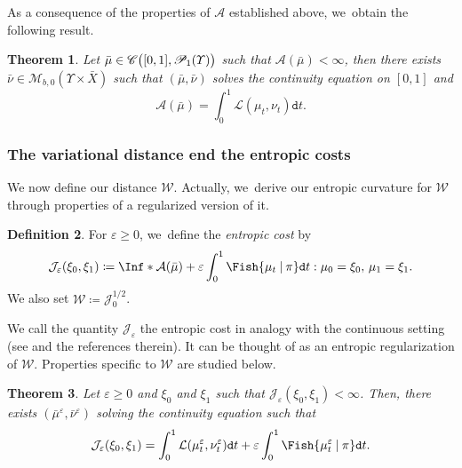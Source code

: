 \documentclass[JEP,XML,SOM,Unicode,published]{cedram}
\newtheorem{theorem}{Theorem}[section]
\theoremstyle{definition}
\newtheorem{definition}[theorem]{Definition}
\theoremstyle{remark}
\DeclarePairedDelimiter{\paren}{\lparen}{\rparen}
\newcommand{\given}[1][]{%
\nonscript\:#1\vert
\allowbreak
\nonscript\:
\mathopen{}}
\begin{document}
As a consequence of the properties of $\mathcal{A}$ established above, we~obtain the following result.

\begin{theorem}\label{t:action-minizers}
Let $\bar{\mu} \in \mathscr{C}\paren[\big]{[0,1], \mathscr{P}_{1}(\varUpsilon)}$ such that $\mathcal{A}(\bar{\mu}) < \infty$, then there exists $\bar{\nu} \in \mathscr{M}_{b,0}(\varUpsilon \times \bar{X})$ such that $(\bar{\mu}, \bar{\nu})$ solves the continuity equation on $[0,1]$ and
\begin{equation*}
\mathcal{A}(\bar{\mu}) = \int_{0}^{1} \mathcal{L}(\mu_{t}, \nu_{t}) \mathtt{d} t.
\end{equation*}
\end{theorem}

\subsubsection{The variational distance end the entropic costs}

We now define our distance $\mathcal{W}$.
Actually, we~derive our entropic curvature for $\mathcal{W}$ through properties of a regularized version of it.
\begin{definition}
For $\varepsilon \geq 0$, we~define the \emph{entropic cost} by
\begin{equation*}
\mathcal{J}_{\varepsilon}(\xi_{0}, \xi_{1}) \coloneq \Inf*{ \mathcal{A}(\bar{\mu}) + \varepsilon \int_{0}^{1} \Fish{ \mu_{t} \given \pi } \mathtt{d} t : \mu_{0} = \xi_{0},\, \mu_{1} = \xi_{1} }.
\end{equation*}
We also set $\mathcal{W} \coloneq \mathcal{J}_{0}^{1/2}$.
\end{definition}
We call the quantity $\mathcal{J}_{\varepsilon}$ the entropic cost in analogy with the continuous setting (see \cite{GigliTamanini} and the references therein).
It can be thought of as an entropic regularization of $\mathcal{W}$.
Properties specific to $\mathcal{W}$ are studied below.

\begin{theorem}\label{t:minimizing-curve}
Let $\varepsilon \geq 0$ and $\xi_{0}$ and $\xi_{1}$ such that $\mathcal{J}_{\varepsilon}(\xi_{0}, \xi_{1}) < \infty$.
Then, there exists $(\bar{\mu}^{\varepsilon}, \bar{\nu}^{\varepsilon})$ solving the continuity equation such that
\begin{equation*}
\mathcal{J}_{\varepsilon}(\xi_{0}, \xi_{1}) = \int_{0}^{1} \mathcal{L}(\mu^{\varepsilon}_{t}, \nu^{\varepsilon}_{t}) \mathtt{d} t + \varepsilon \int_{0}^{1} \Fish{ \mu^{\varepsilon}_{t} \given \pi } \mathtt{d} t.
\end{equation*}
\end{theorem}
\end{document}
